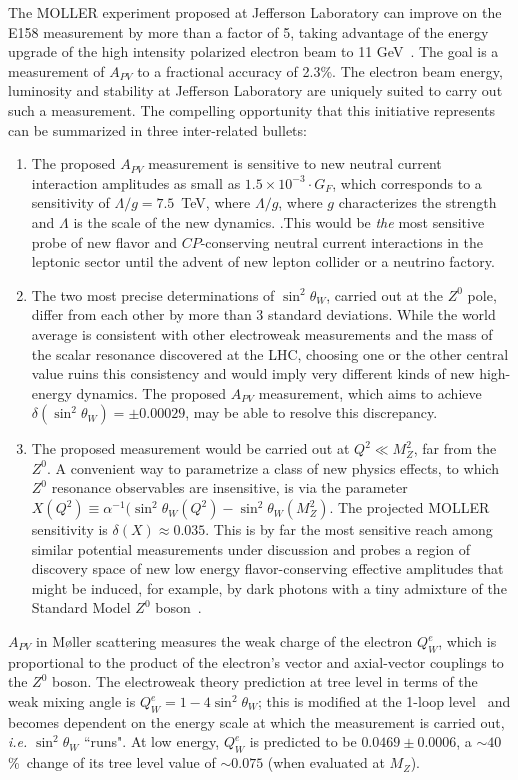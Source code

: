 The MOLLER experiment proposed at Jefferson Laboratory can improve on the E158
measurement by more than a factor of 5, taking advantage of the energy upgrade of the high intensity
polarized electron beam to 11 GeV~\cite{ref:cl:Dudek:2012vr}. The goal is a measurement of $A_{PV}$ to a fractional accuracy
of 2.3\%. 
The electron beam energy, luminosity and stability at Jefferson Laboratory are uniquely suited to carry out such a measurement. 
The compelling opportunity that this initiative represents can be summarized in three inter-related bullets:
\begin{enumerate}
\item The proposed $A_{PV}$ measurement is sensitive to new neutral current interaction amplitudes as 
small as $1.5\times 10^{-3}\cdot G_F$, which corresponds to a sensitivity of $\Lambda/g =  7.5$~TeV, where $\Lambda/g$, where $g$ characterizes the strength and $\Lambda$ is the
scale of the new dynamics. .This would be {\it the} most sensitive probe of new flavor and $C\!P$-conserving 
neutral current interactions in the leptonic sector until the advent of new lepton collider or a neutrino factory. 
\item  The two most precise determinations of 
$\sin^2\theta_W$, carried out at the $Z^0$ pole, differ from each other by more than 3 standard deviations. 
While the world average is consistent with other electroweak measurements and the mass of the scalar resonance 
discovered at the LHC, choosing one or the other central value ruins this consistency and would imply very
different kinds of new high-energy dynamics. The proposed $A_{PV}$ measurement, which aims to achieve
$\delta(\sin^2\theta_W) = \pm 0.00029$, may be able to resolve this discrepancy.
\item The proposed measurement would be carried out at $Q^2\ll M_Z^2$, far from the $Z^0$. A 
convenient way to parametrize a class of new physics effects, to which $Z^0$ resonance observables are 
insensitive, is via the parameter 
$X(Q^2)\equiv\alpha^{-1}(\sin^2\theta_W(Q^2)-\sin^2\theta_W(M_Z^2)$. The projected MOLLER sensitivity is 
$\delta(X)\approx 0.035$. This is by far the most sensitive reach among similar potential
measurements under discussion and probes a region of discovery space of new low
energy flavor-conserving effective amplitudes that might be induced, for example, by dark photons with 
a tiny admixture of the Standard Model $Z^0$ boson~\cite{ref:cl:darkz}. 
\end{enumerate}

$A_{PV}$ in M\o ller scattering measures the weak charge of the electron
$Q^e_W$, which is proportional to the product of the electron's vector and axial-vector couplings to the $Z^0$ boson. 
The electroweak theory prediction at tree level in terms of the weak mixing angle is $Q^e_W = 1 - 4\sin^2\theta_W$; 
this is modified at the 1-loop level~\cite{ref:cl:Czarnecki:1995fw, ref:cl:Czarnecki:2000ic, ref:cl:Erler:2004in} and
becomes dependent on the energy scale at which the measurement is carried out, {\em i.e.} $\sin^2\theta_W$
``runs". At low energy, $Q^e_W$  is predicted to be 
$0.0469\pm 0.0006$, a $\sim 40$\%\ change of its tree level value of $\sim 0.075$ (when evaluated at $M_Z$).

